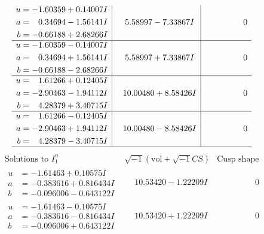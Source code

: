 \documentclass[1p]{elsarticle_modified}
\theoremstyle{definition}
\newcommand{\I}{\sqrt{-1}}
\begin{document}
$$\begin{array}{c|c|c}
\begin{aligned}
u &= -1.60359 + 0.14007 I \\
a &= \phantom{-}0.34694 - 1.56141 I \\
b &= -0.66188 + 2.68266 I\end{aligned}
 & \phantom{-}5.58997 - 7.33867 I & \phantom{-0.000000 } 0 \\ \hline\begin{aligned}
u &= -1.60359 - 0.14007 I \\
a &= \phantom{-}0.34694 + 1.56141 I \\
b &= -0.66188 - 2.68266 I\end{aligned}
 & \phantom{-}5.58997 + 7.33867 I & \phantom{-0.000000 } 0 \\ \hline\begin{aligned}
u &= \phantom{-}1.61266 + 0.12405 I \\
a &= -2.90463 - 1.94112 I \\
b &= \phantom{-}4.28379 + 3.40715 I\end{aligned}
 & \phantom{-}10.00480 + 8.58426 I & \phantom{-0.000000 } 0 \\ \hline\begin{aligned}
u &= \phantom{-}1.61266 - 0.12405 I \\
a &= -2.90463 + 1.94112 I \\
b &= \phantom{-}4.28379 - 3.40715 I\end{aligned}
 & \phantom{-}10.00480 - 8.58426 I & \phantom{-0.000000 } 0\\
 \hline 
 \end{array}$$\newpage$$\begin{array}{c|c|c}  
\text{Solutions to }I^u_{1}& \I (\text{vol} + \sqrt{-1}CS) & \text{Cusp shape}\\
 \hline 
\begin{aligned}
u &= -1.61463 + 0.10575 I \\
a &= -0.383616 + 0.816434 I \\
b &= -0.096006 - 0.643122 I\end{aligned}
 & \phantom{-}10.53420 - 1.22209 I & \phantom{-0.000000 } 0 \\ \hline\begin{aligned}
u &= -1.61463 - 0.10575 I \\
a &= -0.383616 - 0.816434 I \\
b &= -0.096006 + 0.643122 I\end{aligned}
 & \phantom{-}10.53420 + 1.22209 I & \phantom{-0.000000 } 0 \\ \hline\begin{aligned}

\end{aligned}
\end{array}$$
\end{document}
